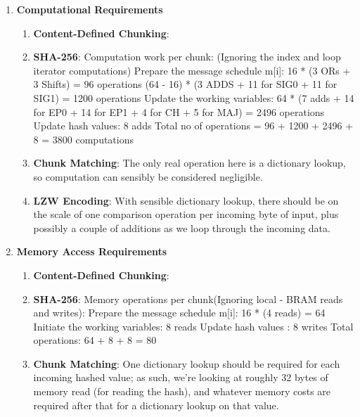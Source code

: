 \documentclass{article}
\begin{document}
\begin{enumerate}
\begin{enumerate}[label=(\alph*)]
\begin{enumerate}[label=(\roman*)]
\end{enumerate}%

\item%
\textbf{Computational Requirements}
\begin{enumerate}[label=(\roman*)]
\item%
\textbf{Content-Defined Chunking}:\newline

\item%
\textbf{SHA-256}:\newline
Computation work per chunk: (Ignoring the index and loop iterator computations)
Prepare the message schedule m[i]: 16 * (3 ORs + 3 Shifts) = 96 operations
 						      (64 - 16) * (3 ADDS + 11 for SIG0 + 11 for SIG1) = 1200 operations
Update the working variables: 64 * (7 adds + 14 for EP0 + 14 for EP1 + 4 for CH + 5 for MAJ) = 2496 operations
Update hash values: 8 adds
Total no of operations = 96 + 1200 + 2496 + 8 = 3800 computations

\item%
\textbf{Chunk Matching}:\newline
The only real operation here is a dictionary lookup, so computation can sensibly be considered negligible.

\item%
\textbf{LZW Encoding}:\newline
With sensible dictionary lookup, there should be on the scale of one comparison operation per incoming byte of input, plus possibly a couple of additions as we loop through the incoming data.


\end{enumerate}%

\item%
\textbf{Memory Access Requirements}
\begin{enumerate}[label=(\roman*)]
\item%
\textbf{Content-Defined Chunking}:\newline

\item%
\textbf{SHA-256}:\newline
Memory operations per chunk(Ignoring local - BRAM reads and writes): 
Prepare the message schedule m[i]: 16 * (4 reads) = 64 
Initiate the working variables: 8 reads  
Update hash values : 8 writes
Total operations: 64 + 8 + 8 = 80 

\item%
\textbf{Chunk Matching}:\newline
One dictionary lookup should be required for each incoming hashed value; as such, we're looking at roughly 32 bytes of memory read (for reading the hash), and whatever memory costs are required after that for a dictionary lookup on that value.


\end{enumerate}
\end{enumerate}
\end{enumerate}
\end{document}
